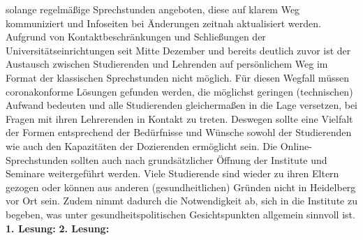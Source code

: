 {        solange regelmäßige Sprechstunden angeboten, diese auf klarem Weg kommuniziert und
        Infoseiten bei Änderungen zeitnah aktualisiert werden.
    }{
        Aufgrund von Kontaktbeschränkungen und Schließungen der Universitätseinrichtungen
        seit Mitte Dezember und bereits deutlich zuvor ist der Austausch zwischen Studierenden
        und Lehrenden auf persönlichem Weg im Format der klassischen Sprechstunden nicht
        möglich. Für diesen Wegfall müssen coronakonforme Lösungen gefunden werden, die
        möglichst geringen (technischen) Aufwand bedeuten und alle Studierenden
        gleichermaßen in die Lage versetzen, bei Fragen mit ihren Lehrerenden in Kontakt zu
        treten. Deswegen sollte eine Vielfalt der Formen entsprechend der Bedürfnisse und
        Wünsche sowohl der Studierenden wie auch den Kapazitäten der Dozierenden
        ermöglicht sein. Die Online-Sprechstunden sollten auch nach grundsätzlicher Öffnung
        der Institute und Seminare weitergeführt werden. Viele Studierende sind wieder zu ihren 
        Eltern gezogen oder können aus anderen (gesundheitlichen) Gründen nicht in Heidelberg
        vor Ort sein. Zudem nimmt dadurch die Notwendigkeit ab, sich in die Institute zu
        begeben, was unter gesundheitspolitischen Gesichtspunkten allgemein sinnvoll ist.
    }{
        \textbf{1. Lesung:}
        \ul{}
        \textbf{2. Lesung:}
        \ul{}
    }{
    }
